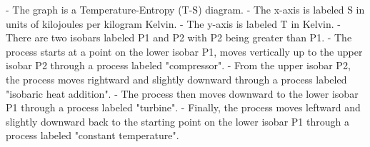 - The graph is a Temperature-Entropy (T-S) diagram.
- The x-axis is labeled S in units of kilojoules per kilogram Kelvin.
- The y-axis is labeled T in Kelvin.
- There are two isobars labeled P1 and P2 with P2 being greater than P1.
- The process starts at a point on the lower isobar P1, moves vertically up to the upper isobar P2 through a process labeled "compressor".
- From the upper isobar P2, the process moves rightward and slightly downward through a process labeled "isobaric heat addition".
- The process then moves downward to the lower isobar P1 through a process labeled "turbine".
- Finally, the process moves leftward and slightly downward back to the starting point on the lower isobar P1 through a process labeled "constant temperature".